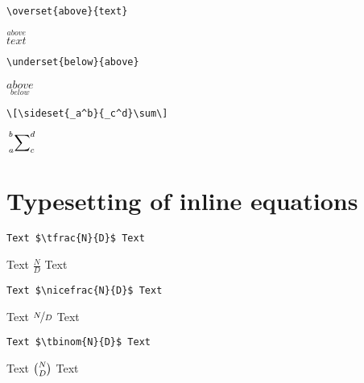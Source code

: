 \begin{center}
\begin{minipage}[l]{.4\textwidth}
\begin{verbatim}
\overset{above}{text}
\end{verbatim}
\end{minipage}
\begin{minipage}[r]{.2\textwidth}
$\overset{above}{text}$
\end{minipage}\vspace{.5cm}

\begin{minipage}[l]{.4\textwidth}
\begin{verbatim}
\underset{below}{above}
\end{verbatim}
\end{minipage}
\begin{minipage}[l]{.2\textwidth}
$\underset{below}{above}$
\end{minipage}\vspace{.5cm}

\begin{minipage}[l]{.4\textwidth}
\begin{verbatim}
\[\sideset{_a^b}{_c^d}\sum\]
\end{verbatim}
\end{minipage}
\begin{minipage}[r]{.2\textwidth}
\qquad\quad $\displaystyle \sideset{_a^b}{_c^d}\sum$
\end{minipage}
\end{center}




\section{Typesetting of inline equations}
\begin{verbatim}
Text $\tfrac{N}{D}$ Text
\end{verbatim}
Text $\tfrac{N}{D}$ Text

\begin{verbatim}
Text $\nicefrac{N}{D}$ Text
\end{verbatim}
Text $\nicefrac{N}{D}$ Text

\begin{verbatim}
Text $\tbinom{N}{D}$ Text
\end{verbatim}
Text $\tbinom{N}{D}$ Text